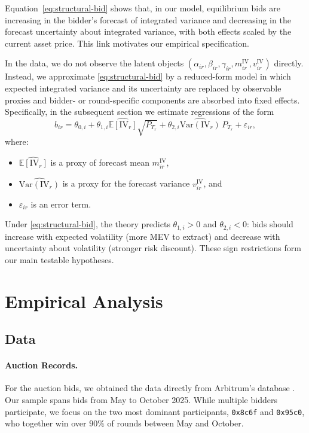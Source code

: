 \documentclass[runningheads]{llncs}
\newcommand{\E}{\mathbb{E}}
\newcommand{\Var}{\mathrm{Var}}
\newcommand{\IV}{\mathrm{IV}}
\begin{document}
Equation~\eqref{eq:structural-bid} shows that, in our model, equilibrium bids are increasing in the bidder's forecast of integrated variance and decreasing in the forecast uncertainty about integrated variance, with both effects scaled by the current asset price. This link motivates our empirical specification.

In the data, we do not observe the latent objects $(\alpha_{ir}, \beta_{ir}, \gamma_{ir}, m^{\IV}_{ir}, v^{\IV}_{ir})$ directly. Instead, we approximate \eqref{eq:structural-bid} by a reduced-form model in which expected integrated variance and its uncertainty are replaced by observable proxies and bidder- or round-specific components are absorbed into fixed effects. Specifically, in the subsequent section we estimate regressions of the form
\begin{equation}\label{eq:reduced-form}
  b_{ir}
  = \theta_{0,i}
    + \theta_{1,i} \widehat{\E [\IV_r]} \sqrt{P_{T_r}}
    + \theta_{2,i} \widehat{\Var (\IV_r)} \, P_{T_r}
    + \varepsilon_{ir},
\end{equation}
where:
\begin{itemize}
  \item $\widehat{\E [\IV_r]}$ is a proxy of forecast mean $m^{\IV}_{ir}$,
  \item $\widehat{\Var (\IV_r)}$ is a proxy for the forecast variance
        $v^{\IV}_{ir}$, and
  \item $\varepsilon_{ir}$ is an error term.
\end{itemize}
Under \eqref{eq:structural-bid}, the theory predicts $\theta_{1,i} > 0$ and $\theta_{2,i} < 0$: bids should increase with expected volatility (more MEV to extract) and decrease with uncertainty about volatility (stronger risk discount). These sign restrictions form our main testable hypotheses.



\section{Empirical Analysis}

\subsection{Data}
\paragraph*{Auction Records.} For the auction bids, we obtained the data directly from Arbitrum's database \cite{offchainlabs2025howtousetimeboost}. Our sample spans bids from May to October 2025. While multiple bidders participate, we focus on the two most dominant participants, \texttt{0x8c6f} and \texttt{0x95c0}, who together win over $90\%$ of rounds between May and October. 
\end{document}
